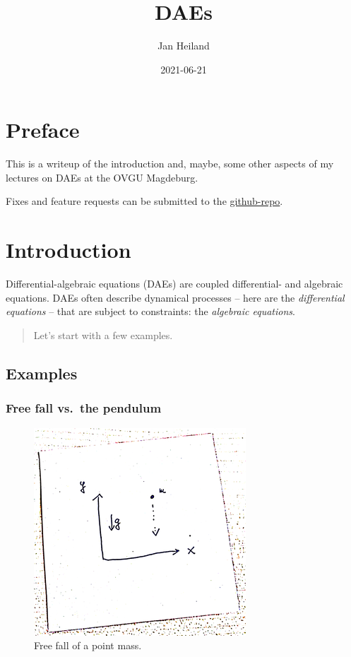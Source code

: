 \documentclass[]{book}
\title{DAEs}
\author{Jan Heiland}
\institute{OVGU/MPI}
\date{2021-06-21}
\newenvironment {JHSAYS} [0] {\begin{quote}\color{jhsc}} {\end{quote}}
\theoremstyle{definition}
\theoremstyle{definition}
\theoremstyle{definition}
\theoremstyle{definition}
\theoremstyle{remark}
\begin{document}
\maketitle

{
\setcounter{tocdepth}{1}
\tableofcontents
}
\hypertarget{preface}{%
\chapter*{Preface}\label{preface}}

This is a writeup of the introduction and, maybe, some other aspects of my lectures on DAEs at the OVGU Magdeburg.

Fixes and feature requests can be submitted to the \href{https://github.com/highlando/script-daes}{github-repo}.

\newcommand{\ind}{\operatorname{ind}}
\newcommand{\rank}{\operatorname{rank}}

\hypertarget{introduction}{%
\chapter{Introduction}\label{introduction}}

Differential-algebraic equations (DAEs) are coupled differential- and algebraic equations. DAEs often describe dynamical processes -- here are the \emph{differential equations} -- that are subject to constraints: the \emph{algebraic equations}.

\begin{JHSAYS}
Let's start with a few examples.
\end{JHSAYS}

\hypertarget{examples}{%
\section{Examples}\label{examples}}

\hypertarget{free-fall-vs.-the-pendulum}{%
\subsection*{Free fall vs.~the pendulum}\label{free-fall-vs.-the-pendulum}}

\begin{figure}

{\centering \includegraphics[width=0.4\linewidth]{pics/freefall} 

}

\caption{Free fall of a point mass.}\label{fig:free-fall}
\end{figure}
\end{document}
